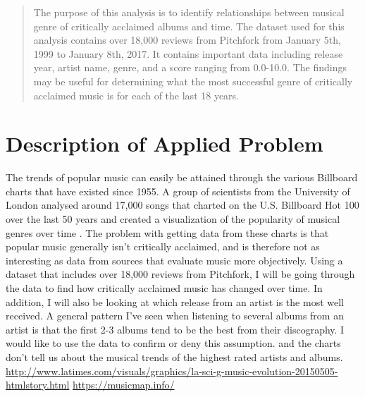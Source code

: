 \documentclass{article}
\begin{document}


\begin{abstract} 
{\bf } The purpose of this analysis is to identify relationships between
musical genre of critically acclaimed albums and time. The dataset used
for this analysis contains over 18,000 reviews from Pitchfork from
January 5th, 1999 to January 8th, 2017. It contains important data
including release year, artist name, genre, and a score ranging from
0.0-10.0. The findings may be useful for determining what the most
successful genre of critically acclaimed music is for each of the last
18 years. \end{abstract} 


\section{Description of Applied
Problem}\label{description-of-applied-problem}

The trends of popular music can easily be attained through the various
Billboard charts that have existed since 1955. A group of scientists
from the University of London analysed around 17,000 songs that charted
on the U.S. Billboard Hot 100 over the last 50 years and created a
visualization of the popularity of musical genres over time
\citep{Billboard100}. The problem with getting data from these charts is
that popular music generally isn't critically acclaimed, and is
therefore not as interesting as data from sources that evaluate music
more objectively. Using a dataset that includes over 18,000 reviews from
Pitchfork, I will be going through the data to find how critically
acclaimed music has changed over time. In addition, I will also be
looking at which release from an artist is the most well received. A
general pattern I've seen when listening to several albums from an
artist is that the first 2-3 albums tend to be the best from their
discography. I would like to use the data to confirm or deny this
assumption. and the charts don't tell us about the musical trends of the
highest rated artists and albums.
\url{http://www.latimes.com/visuals/graphics/la-sci-g-music-evolution-20150505-htmlstory.html}
\url{https://musicmap.info/}
\end{document}
